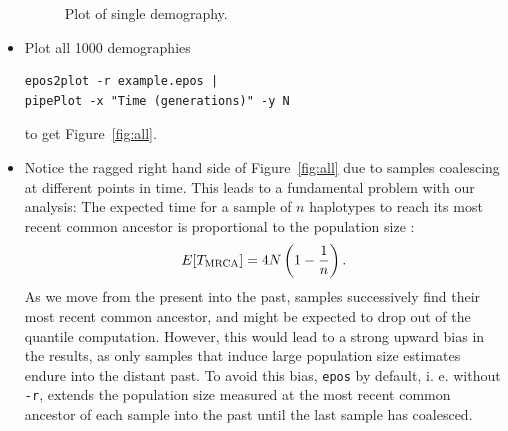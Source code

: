 \documentclass[a4paper]{article}
\newcommand{\ty}{\texttt}
\begin{document}
\begin{itemize}
\begin{figure}
\begin{center}
\end{center}
\caption{Plot of single demography.}\label{fig:sin}
\end{figure}

\item Plot all 1000 demographies
\begin{verbatim}
epos2plot -r example.epos |
pipePlot -x "Time (generations)" -y N
\end{verbatim}
to get Figure~\ref{fig:all}.

\item Notice the ragged right hand side of Figure~\ref{fig:all} due to
  samples coalescing at different points in time. This leads to a
  fundamental problem with our analysis: The expected time for a
  sample of $n$ haplotypes to reach its most recent common ancestor is
  proportional to the population size \cite[p. 76]{wak09:coa}:
\[
E[T_{\rm MRCA}]=4N\left(1-\frac{1}{n}\right).
\]
As we move from the present into the past, samples successively find
their most recent common ancestor, and might be expected to drop out
of the quantile computation. However, this would lead to a strong
upward bias in the results, as only samples that induce large
population size estimates endure into the distant past. To avoid this
bias, \ty{epos} by default, i. e. without \ty{-r}, extends the
population size measured at the most recent common ancestor of each
sample into the past until the last sample has coalesced.



\end{itemize}
\end{document}
